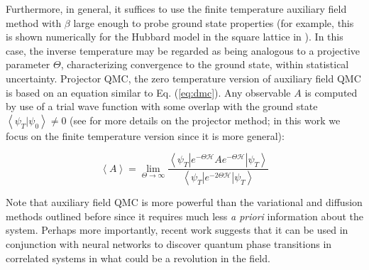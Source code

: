 Furthermore, in general, it suffices to use the finite temperature auxiliary field  method with $\beta$ large enough to probe ground state properties (for example, this is shown numerically for the Hubbard model in the square lattice in \cite{white_numerical_1989}).
In this case, the inverse temperature may be regarded as being analogous to a  projective parameter $\Theta$, characterizing convergence to the ground state, within statistical uncertainty.
Projector \ac{QMC}, the zero temperature version of auxiliary field \ac{QMC} is based on an equation similar to Eq. (\ref{eq:dmc}).
Any observable $A$ is computed by use of a trial wave function with some overlap with the ground state $\left\langle \psi_T | \psi_0 \right\rangle \neq 0$ (see \cite{f._assaad_quantum_2002} for more details on the projector method; in this work we focus on the finite temperature version since it is more general):

\begin{equation}
\left\langle A \right\rangle = \lim_{\Theta \rightarrow \infty} \frac{\left\langle \psi_T | e^{-\Theta \mathcal{H} } A e^{-\Theta \mathcal{H} } | \psi_T \right\rangle }{\left\langle \psi_T | e^{- 2 \Theta \mathcal{H} } | \psi_T \right\rangle}
\end{equation}

Note that auxiliary field \ac{QMC} is more powerful than the variational and diffusion methods outlined before since it requires much less \emph{a priori} information about the system.
Perhaps more importantly, recent work suggests that it can be used in conjunction with neural networks to discover quantum phase transitions in correlated systems  \cite{broecker_machine_2017} in what could be a revolution in the field.